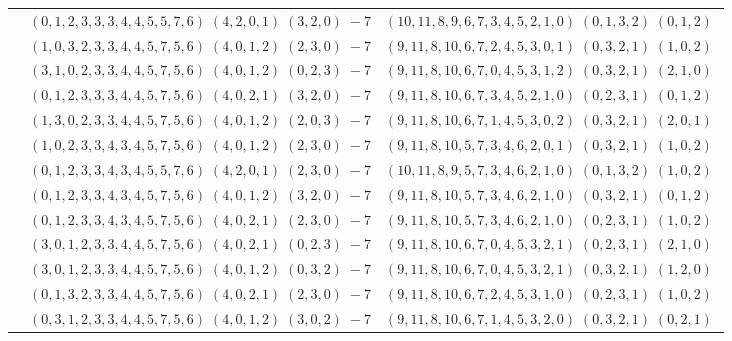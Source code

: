 \documentclass[11pt]{article}
\begin{document}
\begin{longtable}[l]{|c|c|c|}
 \cline{2-3} 
 & $(0 ,1 ,2 ,3 ,3 ,3 ,4 ,4 ,5 ,5 ,7 ,6) \;(4 ,2 ,0 ,1) \;(3 ,2 ,0) \;-7$ & $(10 ,11 ,8 ,9 ,6 ,7 ,3 ,4 ,5 ,2 ,1 ,0) \;(0 ,1 ,3 ,2) \;(0 ,1 ,2) \;$\\ 
 \cline{2-3} 
 & $(1 ,0 ,3 ,2 ,3 ,3 ,4 ,4 ,5 ,7 ,5 ,6) \;(4 ,0 ,1 ,2) \;(2 ,3 ,0) \;-7$ & $(9 ,11 ,8 ,10 ,6 ,7 ,2 ,4 ,5 ,3 ,0 ,1) \;(0 ,3 ,2 ,1) \;(1 ,0 ,2) \;$\\ 
 \cline{2-3} 
 & $(3 ,1 ,0 ,2 ,3 ,3 ,4 ,4 ,5 ,7 ,5 ,6) \;(4 ,0 ,1 ,2) \;(0 ,2 ,3) \;-7$ & $(9 ,11 ,8 ,10 ,6 ,7 ,0 ,4 ,5 ,3 ,1 ,2) \;(0 ,3 ,2 ,1) \;(2 ,1 ,0) \;$\\ 
 \cline{2-3} 
 & $(0 ,1 ,2 ,3 ,3 ,3 ,4 ,4 ,5 ,7 ,5 ,6) \;(4 ,0 ,2 ,1) \;(3 ,2 ,0) \;-7$ & $(9 ,11 ,8 ,10 ,6 ,7 ,3 ,4 ,5 ,2 ,1 ,0) \;(0 ,2 ,3 ,1) \;(0 ,1 ,2) \;$\\ 
 \cline{2-3} 
 & $(1 ,3 ,0 ,2 ,3 ,3 ,4 ,4 ,5 ,7 ,5 ,6) \;(4 ,0 ,1 ,2) \;(2 ,0 ,3) \;-7$ & $(9 ,11 ,8 ,10 ,6 ,7 ,1 ,4 ,5 ,3 ,0 ,2) \;(0 ,3 ,2 ,1) \;(2 ,0 ,1) \;$\\ 
 \cline{2-3} 
 & $(1 ,0 ,2 ,3 ,3 ,4 ,3 ,4 ,5 ,7 ,5 ,6) \;(4 ,0 ,1 ,2) \;(2 ,3 ,0) \;-7$ & $(9 ,11 ,8 ,10 ,5 ,7 ,3 ,4 ,6 ,2 ,0 ,1) \;(0 ,3 ,2 ,1) \;(1 ,0 ,2) \;$\\ 
 \cline{2-3} 
 & $(0 ,1 ,2 ,3 ,3 ,4 ,3 ,4 ,5 ,5 ,7 ,6) \;(4 ,2 ,0 ,1) \;(2 ,3 ,0) \;-7$ & $(10 ,11 ,8 ,9 ,5 ,7 ,3 ,4 ,6 ,2 ,1 ,0) \;(0 ,1 ,3 ,2) \;(1 ,0 ,2) \;$\\ 
 \cline{2-3} 
 & $(0 ,1 ,2 ,3 ,3 ,4 ,3 ,4 ,5 ,7 ,5 ,6) \;(4 ,0 ,1 ,2) \;(3 ,2 ,0) \;-7$ & $(9 ,11 ,8 ,10 ,5 ,7 ,3 ,4 ,6 ,2 ,1 ,0) \;(0 ,3 ,2 ,1) \;(0 ,1 ,2) \;$\\ 
 \cline{2-3} 
 & $(0 ,1 ,2 ,3 ,3 ,4 ,3 ,4 ,5 ,7 ,5 ,6) \;(4 ,0 ,2 ,1) \;(2 ,3 ,0) \;-7$ & $(9 ,11 ,8 ,10 ,5 ,7 ,3 ,4 ,6 ,2 ,1 ,0) \;(0 ,2 ,3 ,1) \;(1 ,0 ,2) \;$\\ 
 \cline{2-3} 
 & $(3 ,0 ,1 ,2 ,3 ,3 ,4 ,4 ,5 ,7 ,5 ,6) \;(4 ,0 ,2 ,1) \;(0 ,2 ,3) \;-7$ & $(9 ,11 ,8 ,10 ,6 ,7 ,0 ,4 ,5 ,3 ,2 ,1) \;(0 ,2 ,3 ,1) \;(2 ,1 ,0) \;$\\ 
 \cline{2-3} 
 & $(3 ,0 ,1 ,2 ,3 ,3 ,4 ,4 ,5 ,7 ,5 ,6) \;(4 ,0 ,1 ,2) \;(0 ,3 ,2) \;-7$ & $(9 ,11 ,8 ,10 ,6 ,7 ,0 ,4 ,5 ,3 ,2 ,1) \;(0 ,3 ,2 ,1) \;(1 ,2 ,0) \;$\\ 
 \cline{2-3} 
 & $(0 ,1 ,3 ,2 ,3 ,3 ,4 ,4 ,5 ,7 ,5 ,6) \;(4 ,0 ,2 ,1) \;(2 ,3 ,0) \;-7$ & $(9 ,11 ,8 ,10 ,6 ,7 ,2 ,4 ,5 ,3 ,1 ,0) \;(0 ,2 ,3 ,1) \;(1 ,0 ,2) \;$\\ 
 \cline{2-3} 
 & $(0 ,3 ,1 ,2 ,3 ,3 ,4 ,4 ,5 ,7 ,5 ,6) \;(4 ,0 ,1 ,2) \;(3 ,0 ,2) \;-7$ & $(9 ,11 ,8 ,10 ,6 ,7 ,1 ,4 ,5 ,3 ,2 ,0) \;(0 ,3 ,2 ,1) \;(0 ,2 ,1) \;$\\ 

\end{longtable}
\end{document}
